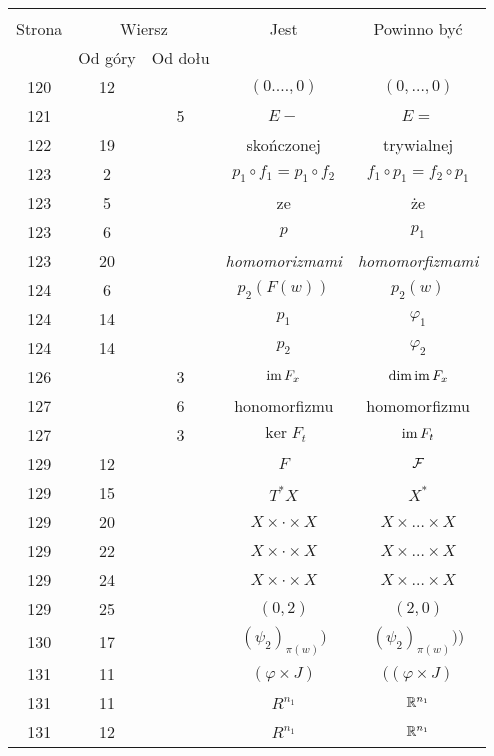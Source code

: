 \documentclass[a4paper,11pt]{article}
\begin{document}
\begin{center}
  \begin{tabular}{|c|c|c|c|c|}
    \hline
    & \multicolumn{2}{c|}{} & & \\
    Strona & \multicolumn{2}{c|}{Wiersz} & Jest
                              & Powinno być \\ \cline{2-3}
    & Od góry & Od dołu & & \\
    \hline
    120 & 12 & & $( 0. \ldots, 0 )$ & $( 0, \ldots, 0 )$ \\
    121 & &  5 & $E -$ & $E =$ \\
    122 & 19 & & skończonej & trywialnej \\
    123 &  2 & & $p_{ 1 } \circ f_{ 1 } = p_{ 1 } \circ f_{ 2 }$
           & $f_{ 1 } \circ p_{ 1 } = f_{ 2 } \circ p_{ 1 }$ \\
    123 &  5 & & ze & że \\
    123 &  6 & & $p$ & $p_{ 1 }$ \\
    123 & 20 & & \textit{homomorizmami} & \textit{homomorfizmami} \\
    124 &  6 & & $p_{ 2 }( F( w ) )$ & $p_{ 2 }( w )$ \\
    124 & 14 & & $p_{ 1 }$ & $\varphi_{ 1 }$ \\
    124 & 14 & & $p_{ 2 }$ & $\varphi_{ 2 }$ \\
    126 & &  3 & $\mathrm{im} \, F_{ x }$ & $\dim\mathrm{im} \, F_{ x }$ \\
    127 & &  6 & honomorfizmu & homomorfizmu \\
    127 & &  3 & $\ker F_{ t }$ & $\mathrm{im} \, F_{ t }$ \\
    129 & 12 & & $F$ & $\mathcal{F}$ \\
    129 & 15 & & $T^{ * }X$ & $X^{ * }$ \\
    129 & 20 & & $X \times \cdot \times X$ & $X \times \ldots \times X$ \\
    129 & 22 & & $X \times \cdot \times X$ & $X \times \ldots \times X$ \\
    129 & 24 & & $X \times \cdot \times X$ & $X \times \ldots \times X$ \\
    129 & 25 & & $( 0, 2 )$ & $( 2, 0 )$ \\
    130 & 17 & & $( \psi_{ 2 } )_{ \pi( w ) } )$
           & $( \psi_{ 2 } )_{ \pi( w ) } ) \big)$ \\
    131 & 11 & & $( \varphi \times J )$ & $( ( \varphi \times J )$ \\
    131 & 11 & & $R^{ n_{ 1 } }$ & $\mathbb{R}^{ n_{ 1 } }$ \\
    131 & 12 & & $R^{ n_{ 1 } }$ & $\mathbb{R}^{ n_{ 1 } }$ \\

\end{tabular}
\end{center}
\end{document}
